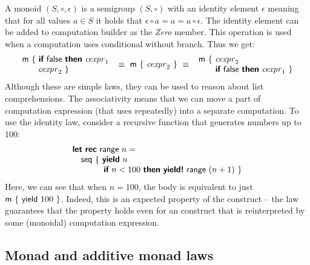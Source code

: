 \documentclass[runningheads,a4paper]{llncs}
\begin{document}
A monoid $(S, \circ, \epsilon)$ is a semigroup $(S, \circ)$ with an identity element $\epsilon$ meaning 
that for all values $a\in S$ it holds that $\epsilon \circ a = a = a \circ \epsilon$. The identity
element can be added to computation builder as the \emph{Zero} member. This operation is used when
a computation uses conditional without  branch. Thus we get:
%
\begin{equation*}
\begin{array}{l}
\textnormal{\sffamily m}~\{~  \textnormal{\bfseries\sffamily if}~\textnormal{\sffamily false}~\textnormal{\bfseries\sffamily then}~ \textnormal{\emph{cexpr}}_1\\
\hspace{1.9em} \textnormal{\emph{cexpr}}_2 ~\}
\end{array} 
~\equiv~
\textnormal{\sffamily m}~\{~ \textnormal{\emph{cexpr}}_2 ~\}\\
~\equiv~
\begin{array}{l}
\textnormal{\sffamily m}~\{~  \textnormal{\emph{cexpr}}_2 \\
\hspace{2.0em} \textnormal{\bfseries\sffamily if}~\textnormal{\sffamily false}~\textnormal{\bfseries\sffamily then}~ \textnormal{\emph{cexpr}}_1 ~\}
\end{array}
\end{equation*}
%
Although these are simple laws, they can be used to reason about list comprehensions. The associativity
means that we can move a part of computation expression (that uses  repeatedly) into a
separate computation. To use the identity law, consider a recursive function that generates numbers
up to 100:
%
\begin{equation*}
\begin{array}{l}
\kvd{let}~\kvd{rec}~\ident{range}~n = \\
\quad \ident{seq}~\{~ \kvd{yield}~n\\
\hspace{3.7em} \kvd{if}~n < 100~\kvd{then}~\kvd{yield!}~\ident{range}~(n + 1)~\}
\end{array}
\end{equation*}
%
Here, we can see that when $n=100$, the body is equivalent to just $\textnormal{\sffamily m}~\{~\textnormal{\sffamily yield}~100~\}$.
Indeed, this is an expected property of the  construct -- the law guarantees that the 
property holds even for an  construct that is reinterpreted by some (monoidal) computation
expression.


\subsection{Monad and additive monad laws}
\label{sec:laws-monads}
\end{document}
